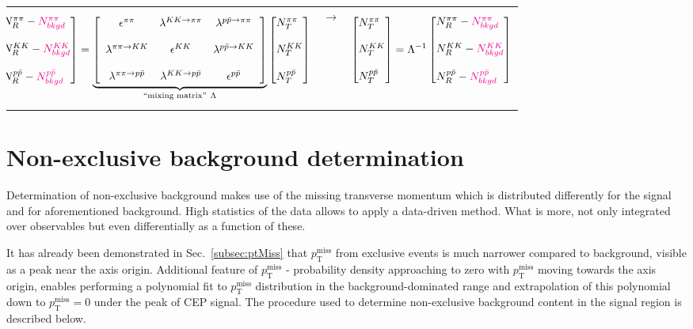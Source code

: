 \begin{tabulary}{\textwidth}{LCL}
\begin{equation}\label{eq:misidentificationMatrix}\hspace*{-15pt}
\Spvek{N^{\pi\pi}_{R}-\textcolor{magenta}{N^{\pi\pi}_{bkgd}};~;N^{KK}_{R}-\textcolor{magenta}{N^{KK}_{bkgd}};~;N^{p\bar{p}}_{R}-\textcolor{magenta}{N^{p\bar{p}}_{bkgd}}} =  \underbrace{\left[ \begin{array}{ccc}
\epsilon^{\pi\pi} & \lambda^{ KK\rightarrow \pi\pi} & \lambda^{p\bar{p} \rightarrow \pi\pi} \\
~ & ~ & ~\\
\lambda^{\pi\pi\rightarrow KK} & \epsilon^{KK} & \lambda^{ p\bar{p} \rightarrow KK}\\
~ & ~ & ~\\
\lambda^{\pi\pi\rightarrow p\bar{p}} & \lambda^{ KK\rightarrow p\bar{p}} & \epsilon^{p\bar{p}}
\end{array} \right]}_{\text{``mixing matrix''}~\Lambda}\Spvek{N^{\pi\pi}_{T};~;N^{KK}_{T};~;N^{p\bar{p}}_{T}}
\end{equation}&%
\vspace{40pt}$\rightarrow$\hspace{20pt}&
\begin{equation}\label{eq:pidUnfoldingMatrix}
\Spvek{N^{\pi\pi}_{T};~;N^{KK}_{T};~;N^{p\bar{p}}_{T}} = \Lambda^{-1}\Spvek{N^{\pi\pi}_{R}-\textcolor{magenta}{N^{\pi\pi}_{bkgd}};~;N^{KK}_{R}-\textcolor{magenta}{N^{KK}_{bkgd}};~;N^{p\bar{p}}_{R}-\textcolor{magenta}{N^{p\bar{p}}_{bkgd}}}
\end{equation}
\end{tabulary}

\section{Non-exclusive background determination}\label{sec:nonExclBkgdDetermination}

Determination of non-exclusive background makes use of the missing transverse momentum which is distributed differently for the signal and for aforementioned background. High statistics of the data allows to apply a data-driven method. What is more, not only integrated over observables but even differentially as a function of these.

It has already been demonstrated in Sec.~\ref{subsec:ptMiss} that $p_{\text{T}}^{\text{miss}}$ from exclusive events is much narrower compared to background, visible as a peak near the axis origin. Additional feature of 
$p_{\text{T}}^{\text{miss}}$ - probability density approaching to zero with $p_{\text{T}}^{\text{miss}}$ moving towards the axis origin, enables performing a polynomial fit to $p_{\text{T}}^{\text{miss}}$ distribution in the background-dominated range and extrapolation of this polynomial down to  $p_{\text{T}}^{\text{miss}} = 0$ under the peak of CEP signal. The procedure used to determine non-exclusive background content in the signal region is described below.



